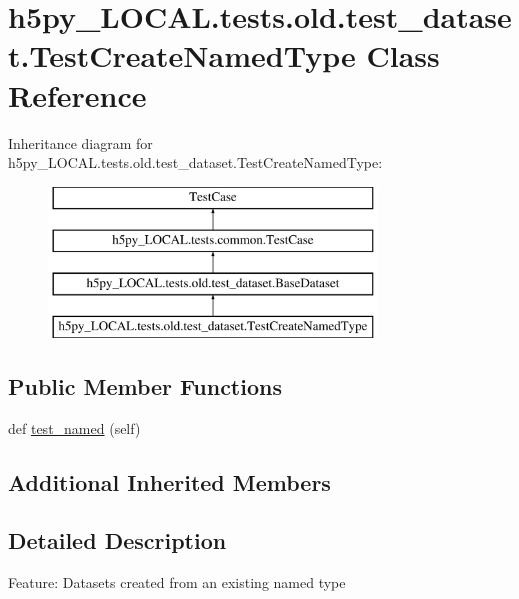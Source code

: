 \hypertarget{classh5py__LOCAL_1_1tests_1_1old_1_1test__dataset_1_1TestCreateNamedType}{}\section{h5py\+\_\+\+L\+O\+C\+A\+L.\+tests.\+old.\+test\+\_\+dataset.\+Test\+Create\+Named\+Type Class Reference}
\label{classh5py__LOCAL_1_1tests_1_1old_1_1test__dataset_1_1TestCreateNamedType}
Inheritance diagram for h5py\+\_\+\+L\+O\+C\+A\+L.\+tests.\+old.\+test\+\_\+dataset.\+Test\+Create\+Named\+Type\+:\begin{figure}[H]
\begin{center}
\leavevmode
\includegraphics[height=4.000000cm]{classh5py__LOCAL_1_1tests_1_1old_1_1test__dataset_1_1TestCreateNamedType}
\end{center}
\end{figure}
\subsection*{Public Member Functions}
\begin{DoxyCompactItemize}
\item 
def \hyperlink{classh5py__LOCAL_1_1tests_1_1old_1_1test__dataset_1_1TestCreateNamedType_a49d4616fd6b93fba45adf0a6f0642a42}{test\+\_\+named} (self)
\end{DoxyCompactItemize}
\subsection*{Additional Inherited Members}


\subsection{Detailed Description}
\begin{DoxyVerb}    Feature: Datasets created from an existing named type
\end{DoxyVerb}
 

